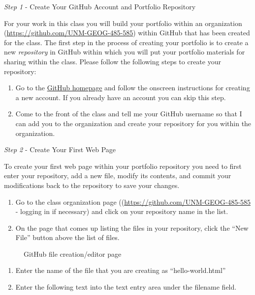 \documentclass[]{book}
\makeatletter
\providecommand{\tightlist}{%
  \setlength{\itemsep}{0pt}\setlength{\parskip}{0pt}}
\def\ScaleIfNeeded{%
  \ifdim\Gin@nat@width>.5\linewidth
    .5\linewidth
  \else
    \Gin@nat@width
  \fi
}
\let\Oldincludegraphics\texttt{[image: \%
 \\catcode`\\@=11\\relax\%
 \%\\gdef\\includegraphics\{\\@ifnextchar[\{\\Oldincludegraphics]}{\Oldincludegraphics[width=\ScaleIfNeeded]}}%
\gdef\texttt{[image: \\@ifnextchar[\{\\Oldincludegraphics]}{\Oldincludegraphics[max size={.75\textwidth}{.75\textheight}]}}%
\makeatother
\begin{document}
\emph{Step 1} - Create Your GitHub Account and Portfolio Repository

For your work in this class you will build your portfolio within an
organization (\url{https://github.com/UNM-GEOG-485-585}) within GitHub
that has been created for the class. The first step in the process of
creating your portfolio is to create a new \emph{repository} in GitHub
within which you will put your portfolio materials for sharing within
the class. Please follow the following steps to create your repository:

\begin{enumerate}
\def\labelenumi{\arabic{enumi}.}
\tightlist
\item
  Go to the \href{https://github.com/}{GitHub homepage} and follow the
  onscreen instructions for creating a new account. If you already have
  an account you can skip this step.
\item
  Come to the front of the class and tell me your GitHub username so
  that I can add you to the organization and create your repository for
  you within the organization.
\end{enumerate}

\emph{Step 2} - Create Your First Web Page

To create your first web page within your portfolio repository you need
to first enter your repository, add a new file, modify its contents, and
commit your modifications back to the repository to save your changes.

\begin{enumerate}
\def\labelenumi{\arabic{enumi}.}
\tightlist
\item
  Go to the class organization page
  ((\url{https://github.com/UNM-GEOG-485-585} - logging in if necessary)
  and click on your repository name in the list.
\item
  On the page that comes up listing the files in your repository, click
  the ``New File'' button above the list of files.
\end{enumerate}

\begin{figure}[htbp]
\centering
\texttt{[image: images/github\_editor.png]}
\caption{GitHub file creation/editor page}
\end{figure}

\begin{enumerate}
\def\labelenumi{\arabic{enumi}.}
\setcounter{enumi}{2}
\tightlist
\item
  Enter the name of the file that you are creating as
  ``hello-world.html''
\item
  Enter the following text into the text entry area under the filename
  field.
\end{enumerate}
\end{document}
